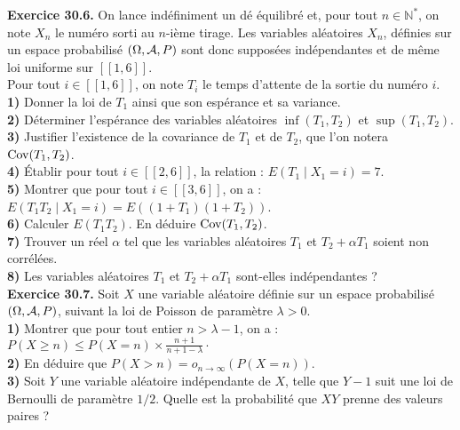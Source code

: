 \documentclass[a4paper,12pt,francais]{article}
\newcommand{\field}[1]{\mathbb{#1}}
\newcommand{\N}{\field{N}}
\begin{document}
\noindent
{\bf Exercice 30.6.} %
On lance indéfiniment un dé équilibré et, pour tout $n\in\N^*$, on note $X_n$ le numéro sorti au $n$-ième tirage. Les variables aléatoires $X_n$, définies sur un espace probabilisé $(\Omega, {\cal{A}},P)$ sont donc supposées indépendantes et de même loi uniforme sur $[\![1, 6]\!]$.\\
Pour tout $i \in [\![1, 6]\!]$, on note $T_i$ le temps d'attente de la sortie du numéro $i$.\\
{\bf 1)} Donner la loi de $T_1$ ainsi que son espérance et sa variance.\\
{\bf 2)} Déterminer l'espérance des variables aléatoires $\inf(T_1 , T_2)$ et $\sup(T_1 , T_2 )$.\\
{\bf 3)} Justifier l'existence de la covariance de $T_1$ et de $T_2$, que l'on notera ${\rm Cov}(T_1 , T_2 )$.\\
{\bf 4)} \'Etablir pour tout $i \in [\![2, 6]\!]$, la relation : $E(T_1 \; |\; X_1 = i) = 7$.\\
{\bf 5)} Montrer que pour tout $i \in [\![3, 6]\!]$, on a : $E(T_1 T_2 \; |\; X_1 = i) = E \left({(1 + T_1 )(1 + T_2 )}\right)$.\\
{\bf 6)} Calculer $E(T_1 T_2 )$. En déduire ${\rm Cov}(T_1 , T_2 )$.\\
{\bf 7)} Trouver un réel $\alpha$ tel que les variables aléatoires $T_1$ et $T_2 + \alpha T_1$ soient non corrélées.\\
{\bf 8)} Les variables aléatoires $T_1$ et $T_2 + \alpha T_1$ sont-elles indépendantes ?\\

\noindent
{\bf Exercice 30.7.} %
Soit $X$ une variable aléatoire définie sur un espace probabilisé $(\Omega,{\cal{A}},P)$, suivant la loi de Poisson de paramètre $\lambda>0$.\\
{\bf 1)} Montrer que pour tout entier $n>\lambda-1$, on a : $P(X \geqslant n) \leqslant P (X = n) \times \frac{n+1}{n+1-\lambda} \cdot$\\
{\bf 2)} En déduire que $ P (X > n) = o_{ n \to \infty} \left( P (X = n) \right)$.\\
{\bf 3)} Soit $Y$ une variable aléatoire indépendante de $X$, telle que $Y-1$ suit une loi de Bernoulli de paramètre $1/2$. Quelle est la probabilité que $XY$ prenne des valeurs paires ?\\
\end{document}
